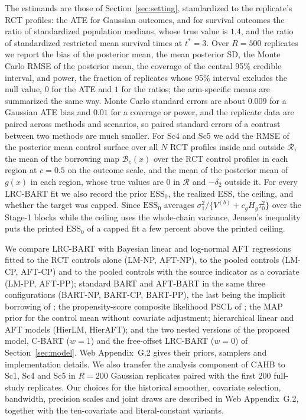 The estimands are those of Section~\ref{sec:setting}, standardized to the replicate's RCT profiles: the ATE for Gaussian outcomes, and for survival outcomes the ratio of standardized population medians, whose true value is $1.4$, and the ratio of standardized restricted mean survival times at $t^\ast=3$. Over $R=500$ replicates we report the bias of the posterior mean, the mean posterior SD, the Monte Carlo RMSE of the posterior mean, the coverage of the central 95\% credible interval, and power, the fraction of replicates whose 95\% interval excludes the null value, $0$ for the ATE and $1$ for the ratios; the arm-specific means are summarized the same way. Monte Carlo standard errors are about $0.009$ for a Gaussian ATE bias and $0.01$ for a coverage or power, and the replicate data are paired across methods and scenarios, so paired standard errors of a contrast between two methods are much smaller. For Sc4 and Sc5 we add the RMSE of the posterior mean control surface over all $N$ RCT profiles inside and outside $\mathcal R$, the mean of the borrowing map $\mathcal B_c(x)$ over the RCT control profiles in each region at $c=0.5$ on the outcome scale, and the mean of the posterior mean of $g(x)$ in each region, whose true values are $0$ in $\mathcal R$ and $-\delta_2$ outside it. For every LRC-BART fit we also record the prior $\mathrm{ESS}_0$, the realized ESS, the ceiling, and whether the target was capped. Since $\mathrm{ESS}_0$ averages $\sigma_1^2/\{V^{(b)}+c_gH_g\tau_0^2\}$ over the Stage-1 blocks while the ceiling uses the whole-chain variance, Jensen's inequality puts the printed $\mathrm{ESS}_0$ of a capped fit a few percent above the printed ceiling.

We compare LRC-BART with Bayesian linear and log-normal AFT regressions fitted to the RCT controls alone (LM-NP, AFT-NP), to the pooled controls (LM-CP, AFT-CP) and to the pooled controls with the source indicator as a covariate (LM-PP, AFT-PP); standard BART and AFT-BART \citep{Chipman2010BART,Sparapani2021BART} in the same three configurations (BART-NP, BART-CP, BART-PP), the last being the implicit borrowing of \citet{ZhouJi2021}; the propensity-score composite likelihood PSCL of \citet{Chen2020PSCL}; the MAP prior for the control mean without covariate adjustment; hierarchical linear and AFT models (HierLM, HierAFT); and the two nested versions of the proposed model, C-BART ($w=1$) and the free-offset LRC-BART ($w=0$) of Section~\ref{sec:model}. Web Appendix~G.2 gives their priors, samplers and implementation details.
We also transfer the analysis component of CAHB \citep{Jin2023CAHB} to Sc1, Sc4 and Sc5 in $R=200$ Gaussian replicates paired with the first $200$ full-study replicates. Our choices for the historical smoother, covariate selection, bandwidth, precision scales and joint draws are described in Web Appendix~G.2, together with the ten-covariate and literal-constant variants.

